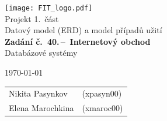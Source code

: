 \documentclass[11pt, a4paper]{article}
\begin{document}
\begin{titlepage}
\begin{center}
    \texttt{[image: FIT\_logo.pdf]} \\
    \Huge{Projekt 1.~část} \\
    \Huge{Datový model (ERD) a model případů užití} \\
    \Large{\textbf{Zadání č.~40.\,--\, Internetový obchod}} \\
    \Large{Databázové systémy}
\end{center}

{\Large
    \today
    \hfill
    \begin{tabular}{l l}
		Nikita Pasynkov & (xpasyn00) \\
		Elena Marochkina & (xmaroc00) \\
    \end{tabular}
}
\end{titlepage}

\setcounter{page}{1}
\tableofcontents
\clearpage

\setcounter{page}{1}
\end{document}
